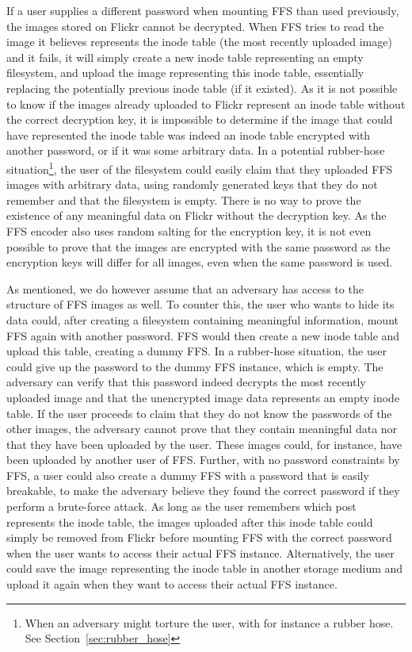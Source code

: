 If a user supplies a different password when mounting FFS than used previously, the images stored on Flickr cannot be decrypted. When FFS tries to read the image it believes represents the inode table (the most recently uploaded image) and it fails, it will simply create a new inode table representing an empty filesystem, and upload the image representing this inode table, essentially replacing the potentially previous inode table (if it existed). As it is not possible to know if the images already uploaded to Flickr represent an inode table without the correct decryption key, it is impossible to determine if the image that could have represented the inode table was indeed an inode table encrypted with another password, or if it was some arbitrary data. In a potential rubber-hose situation\footnote{When an adversary might torture the user, with for instance a rubber hose. See Section~\ref{sec:rubber_hose}}, the user of the filesystem could easily claim that they uploaded FFS images with arbitrary data, using randomly generated keys that they do not remember and that the filesystem is empty. There is no way to prove the existence of any meaningful data on Flickr without the decryption key. As the FFS encoder also uses random salting for the encryption key, it is not even possible to prove that the images are encrypted with the same password as the encryption keys will differ for all images, even when the same password is used. 

As mentioned, we do however assume that an adversary has access to the structure of FFS images as well. To counter this, the user who wants to hide its data could, after creating a filesystem containing meaningful information, mount FFS again with another password. FFS would then create a new inode table and upload this table, creating a dummy FFS. In a rubber-hose situation, the user could give up the password to the dummy FFS instance, which is empty. The adversary can verify that this password indeed decrypts the most recently uploaded image and that the unencrypted image data represents an empty inode table. If the user proceeds to claim that they do not know the passwords of the other images, the adversary cannot prove that they contain meaningful data nor that they have been uploaded by the user. These images could, for instance, have been uploaded by another user of FFS. Further, with no password constraints by FFS, a user could also create a dummy FFS with a password that is easily breakable, to make the adversary believe they found the correct password if they perform a brute-force attack. As long as the user remembers which post represents the inode table, the images uploaded after this inode table could simply be removed from Flickr before mounting FFS with the correct password when the user wants to access their actual FFS instance. Alternatively, the user could save the image representing the inode table in another storage medium and upload it again when they want to access their actual FFS instance.

